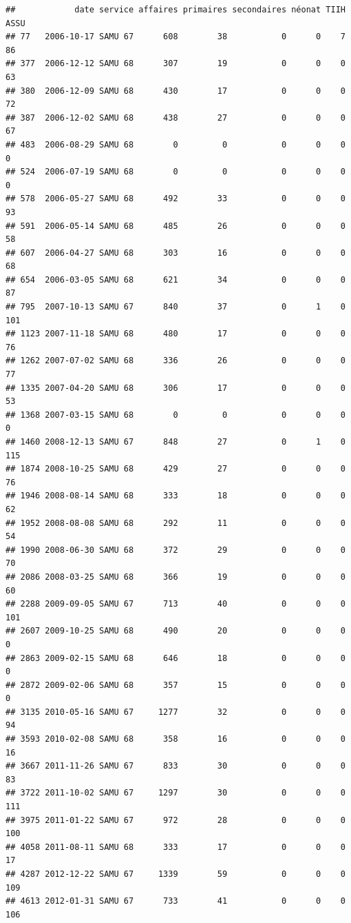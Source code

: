 \documentclass[]{article}
\begin{document}
\begin{verbatim}
##            date service affaires primaires secondaires néonat TIIH ASSU
## 77   2006-10-17 SAMU 67      608        38           0      0    7   86
## 377  2006-12-12 SAMU 68      307        19           0      0    0   63
## 380  2006-12-09 SAMU 68      430        17           0      0    0   72
## 387  2006-12-02 SAMU 68      438        27           0      0    0   67
## 483  2006-08-29 SAMU 68        0         0           0      0    0    0
## 524  2006-07-19 SAMU 68        0         0           0      0    0    0
## 578  2006-05-27 SAMU 68      492        33           0      0    0   93
## 591  2006-05-14 SAMU 68      485        26           0      0    0   58
## 607  2006-04-27 SAMU 68      303        16           0      0    0   68
## 654  2006-03-05 SAMU 68      621        34           0      0    0   87
## 795  2007-10-13 SAMU 67      840        37           0      1    0  101
## 1123 2007-11-18 SAMU 68      480        17           0      0    0   76
## 1262 2007-07-02 SAMU 68      336        26           0      0    0   77
## 1335 2007-04-20 SAMU 68      306        17           0      0    0   53
## 1368 2007-03-15 SAMU 68        0         0           0      0    0    0
## 1460 2008-12-13 SAMU 67      848        27           0      1    0  115
## 1874 2008-10-25 SAMU 68      429        27           0      0    0   76
## 1946 2008-08-14 SAMU 68      333        18           0      0    0   62
## 1952 2008-08-08 SAMU 68      292        11           0      0    0   54
## 1990 2008-06-30 SAMU 68      372        29           0      0    0   70
## 2086 2008-03-25 SAMU 68      366        19           0      0    0   60
## 2288 2009-09-05 SAMU 67      713        40           0      0    0  101
## 2607 2009-10-25 SAMU 68      490        20           0      0    0    0
## 2863 2009-02-15 SAMU 68      646        18           0      0    0    0
## 2872 2009-02-06 SAMU 68      357        15           0      0    0    0
## 3135 2010-05-16 SAMU 67     1277        32           0      0    0   94
## 3593 2010-02-08 SAMU 68      358        16           0      0    0   16
## 3667 2011-11-26 SAMU 67      833        30           0      0    0   83
## 3722 2011-10-02 SAMU 67     1297        30           0      0    0  111
## 3975 2011-01-22 SAMU 67      972        28           0      0    0  100
## 4058 2011-08-11 SAMU 68      333        17           0      0    0   17
## 4287 2012-12-22 SAMU 67     1339        59           0      0    0  109
## 4613 2012-01-31 SAMU 67      733        41           0      0    0  106

\end{verbatim}
\end{document}

